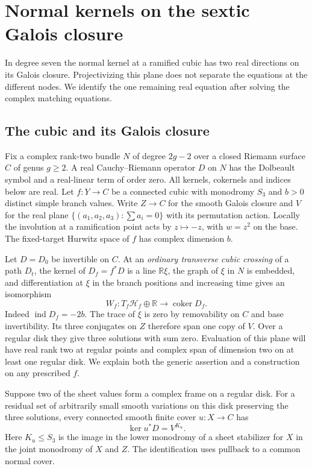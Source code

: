 \section{Normal kernels on the sextic Galois closure}\label{sec:heptic}
In degree seven the normal kernel at a ramified cubic has two real directions on its Galois closure. Projectivizing this plane does not separate the equations at the different nodes. We identify the one remaining real equation after solving the complex matching equations.
\subsection{The cubic and its Galois closure}\label{p14-sec:kernels}

Fix a complex rank-two bundle $N$ of degree $2g-2$ over a closed Riemann
surface $C$ of genus $g\ge2$. A real Cauchy--Riemann operator $D$ on $N$
has the Dolbeault symbol and a real-linear term of order zero. All kernels,
cokernels and indices below are real. Let $f:Y\to C$ be a connected cubic
with monodromy $S_3$ and $b>0$ distinct simple branch values. Write
$Z\to C$ for the smooth Galois closure and $V$ for the real plane
$\{(a_1,a_2,a_3):\sum a_i=0\}$ with its permutation action. Locally
the involution at a ramification point acts by $z\mapsto-z$, with
$w=z^2$ on the base. The fixed-target Hurwitz space of $f$ has complex
dimension $b$.

Let $D=D_0$ be invertible on $C$. At an \emph{ordinary transverse
cubic crossing} of a path $D_t$, the kernel of $D_f=f^*D$ is a line
$\mathbb R\xi$, the graph of $\xi$ in $N$ is embedded, and differentiation
at $\xi$ in the branch positions and increasing time gives an isomorphism
\begin{equation}\label{p14-eq:lowertransverse}
 W_f:T_f\mathcal H_f\oplus\mathbb R\longrightarrow
          \operatorname{coker}D_f .
\end{equation}
Indeed $\operatorname{ind}D_f=-2b$. The trace of $\xi$ is zero by
removability on $C$ and base invertibility. Its three conjugates on $Z$
therefore span one copy of $V$. Over a regular disk they give three
solutions with sum zero. Evaluation of this plane will have real rank
two at regular points and complex span of dimension two on at least
one regular disk. We explain both the generic assertion and a construction
on any prescribed $f$.

\begin{lemma}\label{p14-lem:kernelplane}
Suppose two of the sheet values form a complex frame on a regular disk.
For a residual set of arbitrarily small smooth variations on this disk
preserving the three solutions, every connected smooth finite cover
$u:X\to C$ has
\[
                     \ker u^*D=V^{K_u}.
\]
Here $K_u\le S_3$ is the image in the lower monodromy of a sheet
stabilizer for $X$ in the joint monodromy of $X$ and $Z$. The
identification uses pullback to a common normal cover.
\end{lemma}

